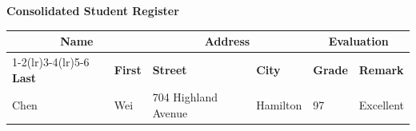 \documentclass[11pt]{article}
\begin{document}
\begin{center}
{\large\bfseries Consolidated Student Register}
\end{center}

\vspace{1.5em}

\begin{center}
\small
\begin{tabular}{@{}llllll@{}}
\toprule
\multicolumn{2}{c}{\textbf{Name}} &
\multicolumn{2}{c}{\textbf{Address}} &
\multicolumn{2}{c}{\textbf{Evaluation}} \\
\cmidrule(lr){1-2}\cmidrule(lr){3-4}\cmidrule(lr){5-6}
\textbf{Last} & \textbf{First} & \textbf{Street} & \textbf{City} &
\textbf{Grade} & \textbf{Remark} \\
\midrule
Chen & Wei & 704 Highland Avenue & Hamilton & 97 & Excellent \\
\bottomrule
\end{tabular}
\end{center}
\end{document}
